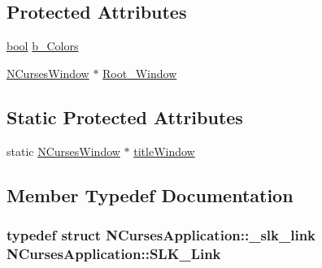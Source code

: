 \subsection*{Protected Attributes}
\begin{DoxyCompactItemize}
\item 
\hyperlink{term__entry_8h_a002004ba5d663f149f6c38064926abac}{bool} \hyperlink{class_n_curses_application_a2e435866a06c43c110e0a435e641c16d}{b\-\_\-\-Colors}
\item 
\hyperlink{class_n_curses_window}{N\-Curses\-Window} $\ast$ \hyperlink{class_n_curses_application_acb60c51b333d257562a32e4bef64a0ba}{Root\-\_\-\-Window}
\end{DoxyCompactItemize}
\subsection*{Static Protected Attributes}
\begin{DoxyCompactItemize}
\item 
static \hyperlink{class_n_curses_window}{N\-Curses\-Window} $\ast$ \hyperlink{class_n_curses_application_a31976ca99082718dcbb567edad6625b0}{title\-Window}
\end{DoxyCompactItemize}


\subsection{Member Typedef Documentation}
\hypertarget{class_n_curses_application_a967e03c00bd923d718a18be735b6104b}{
\subsubsection[{S\-L\-K\-\_\-\-Link}]{\setlength{\rightskip}{0pt plus 5cm}typedef struct {\bf N\-Curses\-Application\-::\-\_\-slk\-\_\-link}  {\bf N\-Curses\-Application\-::\-S\-L\-K\-\_\-\-Link}}}\label{class_n_curses_application_a967e03c00bd923d718a18be735b6104b}



